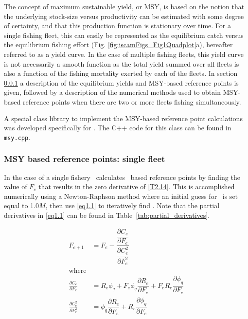 The concept of maximum sustainable yield, or MSY, is based on the notion that the underlying stock-size versus productivity can be estimated with some degree of certainty, and that this production function is stationary over time.  For a single fishing fleet, this can easily be represented as the equilibrium catch versus the equilibrium fishing effort (Fig. \ref{fig:iscamFigs_Fig1Quadplot}a), hereafter referred to as a yield curve. In the case of multiple fishing fleets, this yield curve  is not necessarily a smooth function as the total yield summed over all fleets is also a function of the fishing mortality exerted by each of the fleets.  In section \ref{ssub:msy_based_reference_points} a description of the equilibrium yields and MSY-based reference points is given, followed by a description of the numerical methods used to obtain MSY-based reference points when there are two or more fleets fishing simultaneously.

A special class library to implement the MSY-based reference point calculations was developed specifically for \iscam.  The C++ code for this class can be found in \texttt{msy.cpp}.


\subsubsection{MSY based reference points: single fleet} %
\label{ssub:msy_based_reference_points}



In the case of a single fishery \iscam\ calculates \fmsy\ based reference points by finding the value of $F_e$ that results in the zero derivative of \eqref{T2.14}.  This is accomplished numerically using a Newton-Raphson method where an initial guess for \fmsy\ is set equal to 1.0$M$, then use \eqref{eq1.1} to iteratively find \fmsy.  Note that the partial derivatives in \eqref{eq1.1} can be found in Table~\ref{tab:partial_derivatives}.

\begin{align}\label{eq1.1}
    F_{e+1}&=F_e - 
    \dfrac{ \dfrac{\partial C_e}{\partial F_e}}
    { \dfrac{\partial C_e^2}{\partial F_e^2}}\\
    \mbox{where}\nonumber\\
     \frac{\partial C_e}{\partial F_e} &=
    R_e \phi_q
    + F_e \phi_q \dfrac{\partial R_e}{\partial F_e}
    + F_e R_e \dfrac{\partial \phi_q}{\partial F_e} \nonumber\\
    \frac{\partial C_e^2}{\partial F_e^2} &=
    \phi_q \dfrac{\partial R_e}{\partial F_e}
   +  R_e \dfrac{\partial \phi_q}{\partial F_e}\nonumber
\end{align}

